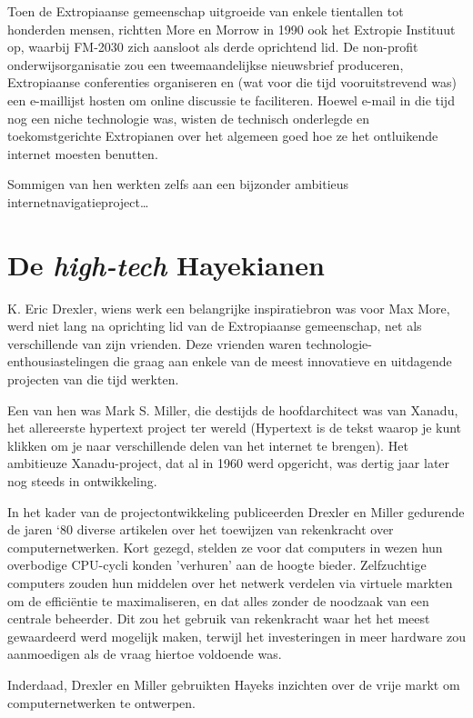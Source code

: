 \documentclass[smalldemyvopaper,11pt,twoside,onecolumn,openright,extrafontsizes,hidelinks]{memoir}
\begin{document}
Toen de Extropiaanse gemeenschap uitgroeide van enkele tientallen tot
honderden mensen, richtten More en Morrow in 1990 ook het Extropie
Instituut op, waarbij FM-2030 zich aansloot als derde oprichtend lid. De
non-profit onderwijsorganisatie zou een tweemaandelijkse nieuwsbrief
produceren, Extropiaanse conferenties organiseren en (wat voor die tijd
vooruitstrevend was) een e-maillijst hosten om online discussie te
faciliteren. Hoewel e-mail in die tijd nog een niche technologie was,
wisten de technisch onderlegde en toekomstgerichte Extropianen over het
algemeen goed hoe ze het ontluikende internet moesten benutten.

Sommigen van hen werkten zelfs aan een bijzonder ambitieus
internetnavigatieproject\ldots{}

\section{\texorpdfstring{De \emph{high-tech}
Hayekianen}{De high-tech Hayekianen}}\label{de-high-tech-hayekianen}

K. Eric Drexler, wiens werk een belangrijke inspiratiebron was voor Max
More, werd niet lang na oprichting lid van de Extropiaanse gemeenschap,
net als verschillende van zijn vrienden. Deze vrienden waren
technologie-enthousiastelingen die graag aan enkele van de meest
innovatieve en uitdagende projecten van die tijd werkten.

Een van hen was Mark S. Miller, die destijds de hoofdarchitect was van
Xanadu, het allereerste hypertext project ter wereld (Hypertext is de
tekst waarop je kunt klikken om je naar verschillende delen van het
internet te brengen). Het ambitieuze Xanadu-project, dat al in 1960 werd
opgericht, was dertig jaar later nog steeds in ontwikkeling.

In het kader van de projectontwikkeling publiceerden Drexler en Miller
gedurende de jaren `80 diverse artikelen over het toewijzen van
rekenkracht over computernetwerken. Kort gezegd, stelden ze voor dat
computers in wezen hun overbodige CPU-cycli konden 'verhuren' aan de
hoogte bieder. Zelfzuchtige computers zouden hun middelen over het
netwerk verdelen via virtuele markten om de efficiëntie te
maximaliseren, en dat alles zonder de noodzaak van een centrale
beheerder. Dit zou het gebruik van rekenkracht waar het het meest
gewaardeerd werd mogelijk maken, terwijl het investeringen in meer
hardware zou aanmoedigen als de vraag hiertoe voldoende was.

Inderdaad, Drexler en Miller gebruikten Hayeks inzichten over de vrije
markt om computernetwerken te ontwerpen.
\end{document}
